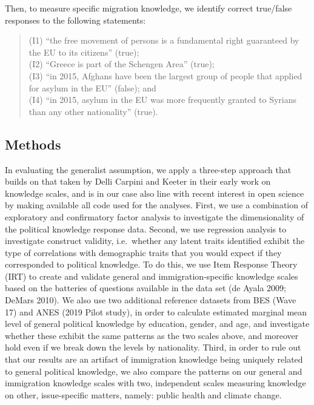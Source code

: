 \documentclass[12pt,halfline,a4paper,]{ouparticle}
\begin{document}
Then, to measure specific migration knowledge, we identify correct
true/false responses to the following statements:

\begin{quote}
(I1) ``the free movement of persons is a fundamental right guaranteed by
the EU to its citizens'' (true);\\
(I2) ``Greece is part of the Schengen Area'' (true);\\
(I3) ``in 2015, Afghans have been the largest group of people that
applied for asylum in the EU'' (false); and\\
(I4) ``in 2015, asylum in the EU was more frequently granted to Syrians
than any other nationality'' (true).
\end{quote}

\hypertarget{methods}{%
\subsection{Methods}\label{methods}}

In evaluating the generalist assumption, we apply a three-step approach
that builds on that taken by Delli Carpini and Keeter in their early
work on knowledge scales, and is in our case also line with recent
interest in open science by making available all code used for the
analyses. First, we use a combination of exploratory and confirmatory
factor analysis to investigate the dimensionality of the political
knowledge response data. Second, we use regression analysis to
investigate construct validity, i.e.~whether any latent traits
identified exhibit the type of correlations with demographic traits that
you would expect if they corresponded to political knowledge. To do
this, we use Item Response Theory (IRT) to create and validate general
and immigration-specific knowledge scales based on the batteries of
questions available in the data set (de Ayala 2009; DeMars 2010). We
also use two additional reference datasets from BES (Wave 17) and ANES
(2019 Pilot study), in order to calculate estimated marginal mean level
of general political knowledge by education, gender, and age, and
investigate whether these exhibit the same patterns as the two scales
above, and moreover hold even if we break down the levels by
nationality. Third, in order to rule out that our results are an
artifact of immigration knowledge being uniquely related to general
political knowledge, we also compare the patterns on our general and
immigration knowledge scales with two, independent scales measuring
knowledge on other, issue-specific matters, namely: public health and
climate change.
\end{document}

